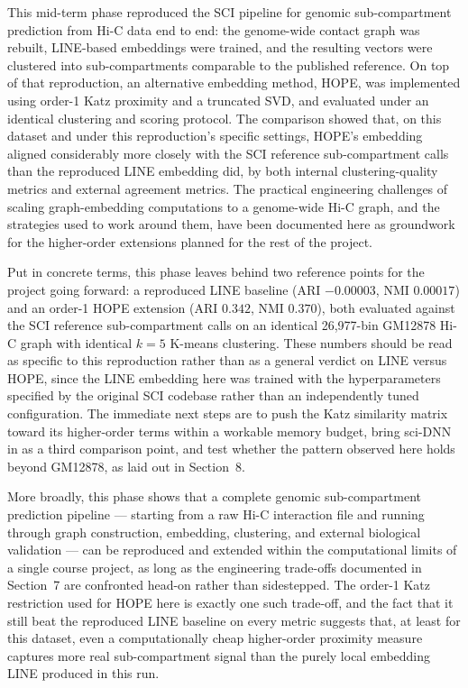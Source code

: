 \documentclass[12pt]{article}
\begin{document}
This mid-term phase reproduced the SCI pipeline for genomic sub-compartment prediction from
Hi-C data end to end: the genome-wide contact graph was rebuilt, LINE-based embeddings were
trained, and the resulting vectors were clustered into sub-compartments comparable to the
published reference. On top of that reproduction, an alternative embedding method, HOPE, was
implemented using order-1 Katz proximity and a truncated SVD, and evaluated under an identical
clustering and scoring protocol. The comparison showed that, on this dataset and under this
reproduction's specific settings, HOPE's embedding aligned considerably more closely with the
SCI reference sub-compartment calls than the reproduced LINE embedding did, by both internal
clustering-quality metrics and external agreement metrics. The practical engineering challenges
of scaling graph-embedding computations to a genome-wide Hi-C graph, and the strategies used to
work around them, have been documented here as groundwork for the higher-order extensions
planned for the rest of the project.

Put in concrete terms, this phase leaves behind two reference points for the project going
forward: a reproduced LINE baseline (ARI $-0.00003$, NMI $0.00017$) and an order-1 HOPE
extension (ARI $0.342$, NMI $0.370$), both evaluated against the SCI reference sub-compartment
calls on an identical 26,977-bin GM12878 Hi-C graph with identical $k=5$ K-means clustering.
These numbers should be read as specific to this reproduction rather than as a general verdict
on LINE versus HOPE, since the LINE embedding here was trained with the hyperparameters
specified by the original SCI codebase rather than an independently tuned configuration. The
immediate next steps are to push the Katz similarity matrix toward its higher-order terms within
a workable memory budget, bring sci-DNN in as a third comparison point, and test whether the
pattern observed here holds beyond GM12878, as laid out in Section~8.

More broadly, this phase shows that a complete genomic sub-compartment prediction pipeline —
starting from a raw Hi-C interaction file and running through graph construction, embedding,
clustering, and external biological validation — can be reproduced and extended within the
computational limits of a single course project, as long as the engineering trade-offs documented
in Section~7 are confronted head-on rather than sidestepped. The order-1 Katz restriction used
for HOPE here is exactly one such trade-off, and the fact that it still beat the reproduced LINE
baseline on every metric suggests that, at least for this dataset, even a computationally cheap
higher-order proximity measure captures more real sub-compartment signal than the purely local
embedding LINE produced in this run.
\end{document}
